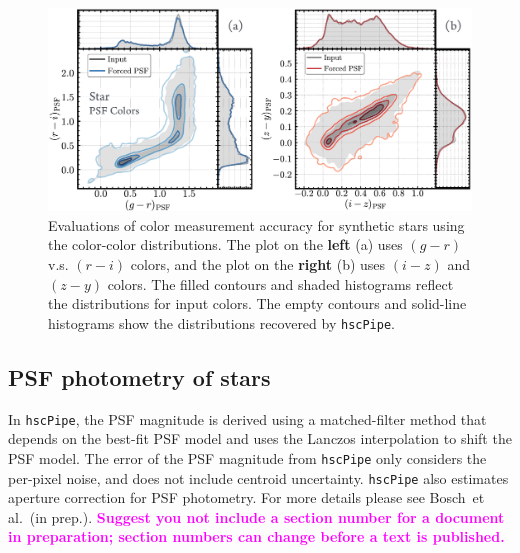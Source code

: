 \documentclass[useamsfonts]{pasj01}
\def\etal{{\ et al.~}}
\def\hscpipe{\texttt{hscPipe}}
\newcommand{\susan}[1]{\textcolor{magenta} {\textbf{#1}}}
\begin{document}
\begin{figure}
    \begin{center}
        \includegraphics[width=\textwidth]{fig/synpipe_psf_cdist}
    \end{center}
    \caption{
        Evaluations of color measurement accuracy for synthetic stars using
        the color-color distributions.
       The plot on the \textbf{left} (a) uses $(g-r)$ v.s. $(r-i)$ colors, and the plot on the \textbf{right} (b) 
        uses $(i-z)$ and $(z-y)$ colors.
        The filled contours and shaded histograms reflect the distributions for input
        colors.
        The empty contours and solid-line histograms show the distributions recovered
        by \hscpipe{}.
        }
    \label{fig:psf_cdist}
\end{figure}

\subsection{PSF photometry of stars}
    \label{ssec:psf}

    In \hscpipe{}, the PSF magnitude is derived using a matched-filter method that
    depends on the best-fit PSF model and uses the Lanczos interpolation to shift
    the PSF model.
    The error of the PSF magnitude from \hscpipe{} only considers the per-pixel noise,
    and does not include centroid uncertainty.
    \hscpipe{} also estimates aperture correction for PSF photometry.
    For more details please see Bosch\etal (in prep.). \susan{Suggest you not include a section number for a document in preparation; section numbers can change before a text is published. }
\end{document}
